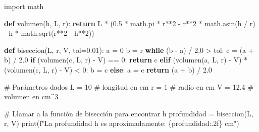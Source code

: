 \documentclass[
  letterpaper,
  DIV=11,
  numbers=noendperiod]{scrartcl}
\newenvironment{Shaded}{\begin{snugshade}}{\end{snugshade}}
\newcommand{\BuiltInTok}[1]{\textcolor[rgb]{0.00,0.23,0.31}{#1}}
\newcommand{\CommentTok}[1]{\textcolor[rgb]{0.37,0.37,0.37}{#1}}
\newcommand{\ControlFlowTok}[1]{\textcolor[rgb]{0.00,0.23,0.31}{\textbf{#1}}}
\newcommand{\DecValTok}[1]{\textcolor[rgb]{0.68,0.00,0.00}{#1}}
\newcommand{\FloatTok}[1]{\textcolor[rgb]{0.68,0.00,0.00}{#1}}
\newcommand{\ImportTok}[1]{\textcolor[rgb]{0.00,0.46,0.62}{#1}}
\newcommand{\KeywordTok}[1]{\textcolor[rgb]{0.00,0.23,0.31}{\textbf{#1}}}
\newcommand{\NormalTok}[1]{\textcolor[rgb]{0.00,0.23,0.31}{#1}}
\newcommand{\OperatorTok}[1]{\textcolor[rgb]{0.37,0.37,0.37}{#1}}
\newcommand{\SpecialCharTok}[1]{\textcolor[rgb]{0.37,0.37,0.37}{#1}}
\newcommand{\SpecialStringTok}[1]{\textcolor[rgb]{0.13,0.47,0.30}{#1}}
\begin{document}
\begin{Shaded}
\begin{Highlighting}[]
\ImportTok{import}\NormalTok{ math}

\KeywordTok{def}\NormalTok{ volumen(h, L, r):}
    \ControlFlowTok{return}\NormalTok{ L }\OperatorTok{*}\NormalTok{ (}\FloatTok{0.5} \OperatorTok{*}\NormalTok{ math.pi }\OperatorTok{*}\NormalTok{ r}\OperatorTok{**}\DecValTok{2} \OperatorTok{{-}}\NormalTok{ r}\OperatorTok{**}\DecValTok{2} \OperatorTok{*}\NormalTok{ math.asin(h }\OperatorTok{/}\NormalTok{ r) }\OperatorTok{{-}}\NormalTok{ h }\OperatorTok{*}\NormalTok{ math.sqrt(r}\OperatorTok{**}\DecValTok{2} \OperatorTok{{-}}\NormalTok{ h}\OperatorTok{**}\DecValTok{2}\NormalTok{))}

\KeywordTok{def}\NormalTok{ biseccion(L, r, V, tol}\OperatorTok{=}\FloatTok{0.01}\NormalTok{):}
\NormalTok{    a }\OperatorTok{=} \DecValTok{0}
\NormalTok{    b }\OperatorTok{=}\NormalTok{ r}
    \ControlFlowTok{while}\NormalTok{ (b }\OperatorTok{{-}}\NormalTok{ a) }\OperatorTok{/} \FloatTok{2.0} \OperatorTok{\textgreater{}}\NormalTok{ tol:}
\NormalTok{        c }\OperatorTok{=}\NormalTok{ (a }\OperatorTok{+}\NormalTok{ b) }\OperatorTok{/} \FloatTok{2.0}
        \ControlFlowTok{if}\NormalTok{ (volumen(c, L, r) }\OperatorTok{{-}}\NormalTok{ V) }\OperatorTok{==} \DecValTok{0}\NormalTok{:}
            \ControlFlowTok{return}\NormalTok{ c}
        \ControlFlowTok{elif}\NormalTok{ (volumen(a, L, r) }\OperatorTok{{-}}\NormalTok{ V) }\OperatorTok{*}\NormalTok{ (volumen(c, L, r) }\OperatorTok{{-}}\NormalTok{ V) }\OperatorTok{\textless{}} \DecValTok{0}\NormalTok{:}
\NormalTok{            b }\OperatorTok{=}\NormalTok{ c}
        \ControlFlowTok{else}\NormalTok{:}
\NormalTok{            a }\OperatorTok{=}\NormalTok{ c}
    \ControlFlowTok{return}\NormalTok{ (a }\OperatorTok{+}\NormalTok{ b) }\OperatorTok{/} \FloatTok{2.0}

\CommentTok{\# Parámetros dados}
\NormalTok{L }\OperatorTok{=} \DecValTok{10}  \CommentTok{\# longitud en cm}
\NormalTok{r }\OperatorTok{=} \DecValTok{1}   \CommentTok{\# radio en cm}
\NormalTok{V }\OperatorTok{=} \FloatTok{12.4}  \CommentTok{\# volumen en cm\^{}3}

\CommentTok{\# Llamar a la función de bisección para encontrar h}
\NormalTok{profundidad }\OperatorTok{=}\NormalTok{ biseccion(L, r, V)}
\BuiltInTok{print}\NormalTok{(}\SpecialStringTok{f"La profundidad h es aproximadamente: }\SpecialCharTok{\{}\NormalTok{profundidad}\SpecialCharTok{:.2f\}}\SpecialStringTok{ cm"}\NormalTok{)}
\end{Highlighting}
\end{Shaded}
\end{document}

